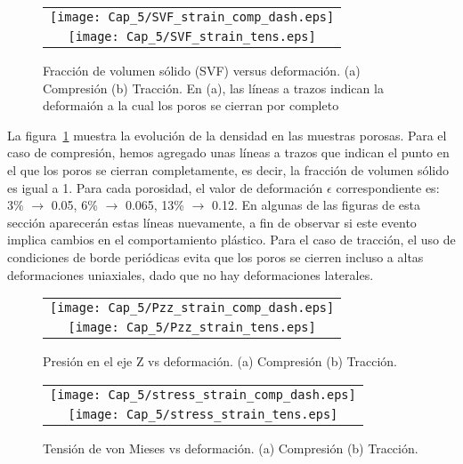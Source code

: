 \begin{figure}[h!]
  \centering
  \begin{tabular} {c}
    \texttt{[image: Cap\_5/SVF\_strain\_comp\_dash.eps]}\\
    \texttt{[image: Cap\_5/SVF\_strain\_tens.eps]}\\
  \end{tabular}
  \caption[Fracción de volumen sólido (SVF) versus deformación.]{Fracción de volumen sólido (SVF) versus deformación. (a) Compresión
  (b) Tracción. En (a), las líneas a trazos indican la deformaión a la cual los poros se cierran por completo}
  \label{C5:fg:svf}
\end{figure}

La figura~\ref{C5:fg:svf} muestra la evolución de la densidad en las muestras porosas. Para el caso de compresión, hemos agregado unas líneas a trazos
que indican el punto en el que los poros se cierran completamente, es decir, la fracción de volumen sólido es igual a 1.
Para cada porosidad, el valor de deformación $\epsilon$ correspondiente es: 3\% $\rightarrow$ 0.05, 6\% $\rightarrow$ 0.065, 13\% $\rightarrow$ 0.12.
En algunas de las figuras de esta sección aparecerán estas líneas nuevamente, a fin de observar si este evento implica cambios en el comportamiento
plástico. Para el caso de tracción, el uso de condiciones de borde periódicas evita que los poros se cierren incluso a altas
deformaciones uniaxiales, dado que no hay deformaciones laterales.

\begin{figure}[h!]
  \centering
  \begin{tabular} {c}
    \texttt{[image: Cap\_5/Pzz\_strain\_comp\_dash.eps]}\\
    \texttt{[image: Cap\_5/Pzz\_strain\_tens.eps]}\\
  \end{tabular}
  \caption[Presión en el eje Z vs deformación.]{Presión en el eje Z vs deformación. (a) Compresión (b) Tracción.}
  \label{C5:fg:pzz2}
\end{figure}

\begin{figure}[h!]
  \centering
  \begin{tabular} {c}
    \texttt{[image: Cap\_5/stress\_strain\_comp\_dash.eps]}\\
    \texttt{[image: Cap\_5/stress\_strain\_tens.eps]}\\
  \end{tabular}
  \caption[Tensión de von Mieses vs deformación.]{Tensión de von Mieses vs deformación. (a) Compresión (b) Tracción.}
  \label{C5:fg:stress}
\end{figure}

